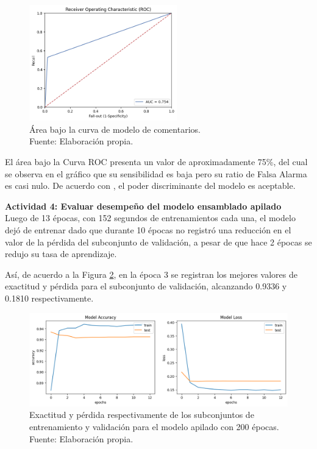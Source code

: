 \begin{figure}[!ht]
	\begin{center}
		\includegraphics[width=0.57\textwidth]{5/figures/comments_auc.png}
		\caption[Área bajo la curva de modelo de comentarios]{Área bajo la curva de modelo de comentarios.\\
		Fuente: Elaboración propia.}
		\label{5:fig9}
	\end{center}
\end{figure}

El área bajo la Curva ROC presenta un valor de aproximadamente 75\%, del cual se observa en el gráfico que su sensibilidad es baja pero su ratio de Falsa Alarma es casi nulo. De acuerdo con \cite{bk_britos2006datamining}, el poder discriminante del modelo es aceptable.

\textbf{Actividad 4: Evaluar desempeño del modelo ensamblado apilado}
\\
Luego de 13 épocas, con 152 segundos de entrenamientos cada una, el modelo dejó de entrenar dado que durante 10 épocas no registró una reducción en el valor de la pérdida del subconjunto de validación, a pesar de que hace 2 épocas se redujo su tasa de aprendizaje.

Así, de acuerdo a la Figura \ref{5:fig10}, en la época 3 se registran los mejores valores de exactitud y pérdida para el subconjunto de validación, alcanzando 0.9336 y 0.1810 respectivamente.

\begin{figure}[!ht]
	\begin{center}
		\includegraphics[width=1\textwidth]{5/figures/stacked_model_acc_loss.png}
		\caption[Exactitud y pérdida respectivamente de los subconjuntos de entrenamiento y validación para el modelo apilado con 200 épocas]{Exactitud y pérdida respectivamente de los subconjuntos de entrenamiento y validación para el modelo apilado con 200 épocas.\\
		Fuente: Elaboración propia.}
		\label{5:fig10}
	\end{center}
\end{figure}

